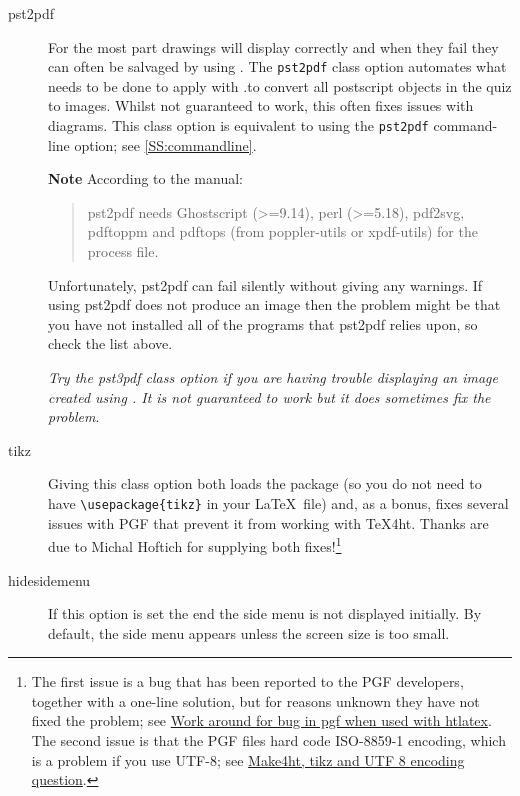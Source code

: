 \documentclass[svgnames]{article}
\begin{document}
\begin{description}
  \item[pst2pdf] 
    For the most part  drawings will display correctly and
    when they fail they can often be salvaged by using . The
    \Verb|pst2pdf| class option automates what needs to be done to apply
     with \MathQuiz.to convert all postscript objects in the
    quiz to images. Whilst not guaranteed to work, this often fixes issues
    with  diagrams. This class option is equivalent to
    using the \Verb|pst2pdf| command-line option; see
    \autoref{SS:commandline}.

    

    \textbf{Note} According to the  manual:

    \begin{quote}
      \textsf{pst2pdf} needs Ghostscript (>=9.14), perl (>=5.18), pdf2svg, pdftoppm
      and pdftops (from poppler-utils or xpdf-utils) for the process file.
    \end{quote}

    Unfortunately, \textsf{pst2pdf} can fail silently without giving any warnings. If
    using \textsf{pst2pdf} does not produce an image then the problem
    might be that you have not installed all of the programs that
    \textsf{pst2pdf} relies upon, so check the list above.

    \textit{Try the pst3pdf class option if you are having trouble
    displaying an image created using . It is not
    guaranteed to work but it does sometimes fix the problem}.

  \item[tikz]
    Giving this class option both loads the  package (so
    you do not need to have \Verb|\usepackage{tikz}| in your \LaTeX\ file)
    and, as a bonus, fixes several issues with PGF that prevent it from
    working with \TeX 4ht. Thanks are due to Michal Hoftich for supplying
    both fixes!\footnote{The first issue is a bug that has been reported
    to the PGF developers, together with a one-line solution, but for
    reasons unknown they have not fixed the problem; see
    \href{https://tex.stackexchange.com/questions/386757}{Work around for
    bug in pgf when used with htlatex}.  The second issue is that the PGF
    files hard code \textsf{ISO-8859-1} encoding, which is a problem if
    you use UTF-8; see
    \href{https://tex.stackexchange.com/questions/390421}{Make4ht, tikz
    and UTF 8 encoding question}.  }

    

  \item[hidesidemenu]
    If this option is set the end the side menu is not displayed
    initially.  By default, the side menu appears unless the screen size
    is too small.

\end{description}
\end{document}
